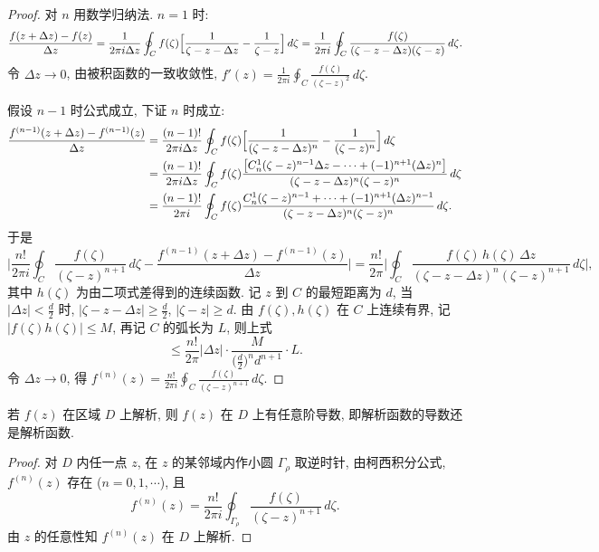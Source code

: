 \documentclass[theorem=false,mathfont=none,openany,sub3section]{easybook}
\begin{document}
\begin{proof}
  对 $n$ 用数学归纳法. $n=1$ 时:
  \[
  \frac{f(z+\Delta z)-f(z)}{\Delta z}
  =\frac{1}{2\pi i\Delta z}\oint_{C}f(\zeta)\Bigl[\frac{1}{\zeta-z-\Delta z}-\frac{1}{\zeta-z}\Bigr]\,d\zeta
  =\frac{1}{2\pi i}\oint_{C}\frac{f(\zeta)}{(\zeta-z-\Delta z)(\zeta-z)}\,d\zeta.
  \]
  令 $\Delta z\to0$, 由被积函数的一致收敛性, $f'(z)=\frac{1}{2\pi i}\oint_{C}\frac{f(\zeta)}{(\zeta-z)^{2}}\,d\zeta$.

  假设 $n-1$ 时公式成立, 下证 $n$ 时成立:
  \[
  \begin{aligned}
  \frac{f^{(n-1)}(z+\Delta z)-f^{(n-1)}(z)}{\Delta z}
  &=\frac{(n-1)!}{2\pi i\Delta z}\oint_{C}f(\zeta)
    \Bigl[\frac{1}{(\zeta-z-\Delta z)^{n}}-\frac{1}{(\zeta-z)^{n}}\Bigr]\,d\zeta\\
  &=\frac{(n-1)!}{2\pi i\Delta z}\oint_{C}f(\zeta)
    \frac{\bigl[C_{n}^{1}(\zeta-z)^{n-1}\Delta z-\cdots+(-1)^{n+1}(\Delta z)^{n}\bigr]}
         {(\zeta-z-\Delta z)^{n}(\zeta-z)^{n}}\,d\zeta\\
  &=\frac{(n-1)!}{2\pi i}\oint_{C}f(\zeta)
    \frac{C_{n}^{1}(\zeta-z)^{n-1}+\cdots+(-1)^{n+1}(\Delta z)^{n-1}}
         {(\zeta-z-\Delta z)^{n}(\zeta-z)^{n}}\,d\zeta.
  \end{aligned}
  \]
  于是
  \[
  \Biggl|\frac{n!}{2\pi i}\oint_{C}\frac{f(\zeta)}{(\zeta-z)^{n+1}}\,d\zeta
  -\frac{f^{(n-1)}(z+\Delta z)-f^{(n-1)}(z)}{\Delta z}\Biggr|
  =\frac{n!}{2\pi}\Biggl|\oint_{C}\frac{f(\zeta)\,h(\zeta)\,\Delta z}{(\zeta-z-\Delta z)^{n}(\zeta-z)^{n+1}}\,d\zeta\Biggr|,
  \]
  其中 $h(\zeta)$ 为由二项式差得到的连续函数.
  记 $z$ 到 $C$ 的最短距离为 $d$, 当 $|\Delta z|<\frac{d}{2}$ 时,
  $|\zeta-z-\Delta z|\geq\frac{d}{2}$, $|\zeta-z|\geq d$.
  由 $f(\zeta),h(\zeta)$ 在 $C$ 上连续有界, 记 $|f(\zeta)h(\zeta)|\leq M$,
  再记 $C$ 的弧长为 $L$, 则上式
  \[
  \leq\frac{n!}{2\pi}|\Delta z|\cdot\frac{M}{\bigl(\frac{d}{2}\bigr)^{n}d^{n+1}}\cdot L.
  \]
  令 $\Delta z\to0$, 得 $f^{(n)}(z)=\frac{n!}{2\pi i}\oint_{C}\frac{f(\zeta)}{(\zeta-z)^{n+1}}\,d\zeta$.
\end{proof}

\begin{corollary}
  若 $f(z)$ 在区域 $D$ 上解析, 则 $f(z)$ 在 $D$ 上有任意阶导数, 即解析函数的导数还是解析函数.
\end{corollary}

\begin{proof}
  对 $D$ 内任一点 $z$, 在 $z$ 的某邻域内作小圆 $\Gamma_{\rho}$ 取逆时针, 由柯西积分公式, $f^{(n)}(z)$ 存在 ($n=0,1,\cdots$), 且
  \[
  f^{(n)}(z)=\frac{n!}{2\pi i}\oint_{\Gamma_{\rho}}\frac{f(\zeta)}{(\zeta-z)^{n+1}}\,d\zeta.
  \]
  由 $z$ 的任意性知 $f^{(n)}(z)$ 在 $D$ 上解析.
\end{proof}
\end{document}
